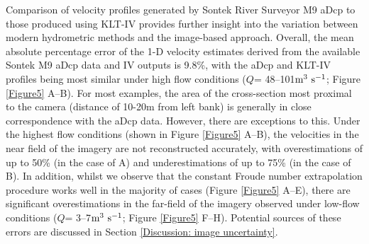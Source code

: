 \documentclass[hess, manuscript]{copernicus} %
\begin{document}
Comparison of velocity profiles generated by Sontek River Surveyor M9 aDcp to those produced using KLT-IV provides further insight into the variation between modern hydrometric methods \citep{ISO24578} and the image-based approach. Overall, the mean absolute percentage error of the 1-D velocity estimates derived from the available Sontek M9 aDcp data and IV outputs is 9.8\%, with the aDcp and KLT-IV profiles being most similar under high flow conditions (${Q}$= 48--101$\textnormal{m\textsuperscript{3} s\textsuperscript{-1}}$; Figure \ref{Figure5} A--B). For most examples, the area of the cross-section most proximal to the camera (distance of 10-20m from left bank) is generally in close correspondence with the aDcp data. However, there are exceptions to this. Under the highest flow conditions (shown in Figure \ref{Figure5} A--B), the velocities in the near field of the imagery are not reconstructed accurately, with overestimations of up to 50\% (in the case of A) and underestimations of up to 75\% (in the case of B). In addition, whilst we observe that the constant Froude number extrapolation procedure works well in the majority of cases (Figure \ref{Figure5} A--E), there are significant overestimations in the far-field of the imagery observed under low-flow conditions (${Q}$= 3--7$\textnormal{m\textsuperscript{3} s\textsuperscript{-1}}$; Figure \ref{Figure5} F--H). Potential sources of these errors are discussed in Section \ref{Discussion: image uncertainty}.
\end{document}
